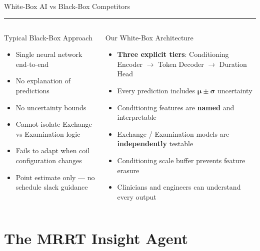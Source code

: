\documentclass[aspectratio=169,12pt]{beamer}
\newcommand{\tealsep}{\vspace{1pt}\textcolor{SiemensTeal}{\rule{\linewidth}{1pt}}\vspace{4pt}}
\begin{document}
\begin{frame}[shrink=12]{White-Box AI vs Black-Box Competitors}
\tealsep
\begin{columns}[T]
\begin{alertblock}{Typical Black-Box Approach}
  \begin{itemize}\setlength\itemsep{2pt}
    \item Single neural network end-to-end
    \item No explanation of predictions
    \item No uncertainty bounds
    \item Cannot isolate Exchange vs Examination logic
    \item Fails to adapt when coil configuration changes
    \item Point estimate only — no schedule slack guidance
  \end{itemize}
\end{alertblock}

\begin{exampleblock}{Our White-Box Architecture}
  \begin{itemize}\setlength\itemsep{2pt}
    \item \textbf{Three explicit tiers}: Conditioning Encoder $\to$ Token Decoder $\to$ Duration Head
    \item Every prediction includes $\boldsymbol{\mu \pm \sigma}$ uncertainty
    \item Conditioning features are \textbf{named} and interpretable
    \item Exchange / Examination models are \textbf{independently} testable
    \item Conditioning scale buffer prevents feature erasure
    \item \alert{Clinicians and engineers can understand every output}
  \end{itemize}
\end{exampleblock}
\end{columns}
\end{frame}

\section{The MRRT Insight Agent}
\end{document}
